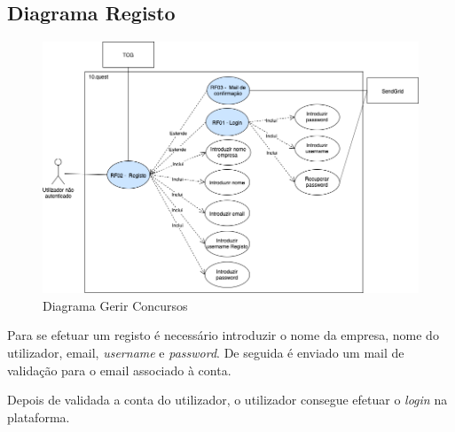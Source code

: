 \newpage

\subsection{Diagrama Registo}
\label{d:registo}
\begin{figure}[ht!]
	\begin{center}
		\includegraphics[width=1\textwidth]{img/rf/registo}
		\caption{Diagrama Gerir Concursos}
		\label{fig:rf-registo}
	\end{center}
\end{figure}

Para se efetuar um registo é necessário introduzir o nome da empresa, nome do utilizador, email, \textit{username} e \textit{password}. De seguida é enviado um mail de validação para o email associado à conta.

Depois de validada a conta do utilizador, o utilizador consegue efetuar o \textit{login} na plataforma.



\newpage

